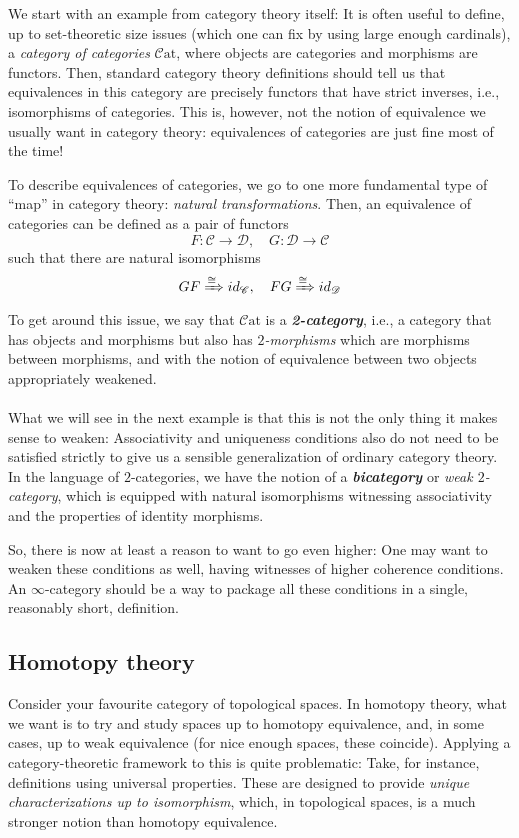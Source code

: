 \documentclass{article}
\newcommand{\textbi}[1]{\textbf{\textit{#1}}}
\newcommand{\C}{\mathscr{C}}
\newcommand{\D}{\mathscr{D}}
\theoremstyle{definition}
\begin{document}
We start with an example from category theory itself: It is often useful to define, up to set-theoretic size issues (which one can fix by using large enough cardinals), a \textit{category of categories} $\mathscr{C}\mathrm{at}$, where objects are categories and morphisms are functors. Then, standard category theory definitions should tell us that equivalences in this category are precisely functors that have strict inverses, i.e., isomorphisms of categories. This is, however, not the notion of equivalence we usually want in category theory: equivalences of categories are just fine most of the time!
\par To describe equivalences of categories, we go to one more fundamental type of ``map'' in category theory: \textit{natural transformations}. Then, an equivalence of categories can be defined as a pair of functors 
$$F:\C\to \D,\quad G:\D\to \C$$
such that there are natural isomorphisms $$GF\xRightarrow{\cong}id_\C, \quad FG\xRightarrow{\cong}id_\D$$
To get around this issue, we say that $\mathscr{C}\mathrm{at}$ is a \textbi{2-category}, i.e., a category that has objects and morphisms but also has \textit{$2$-morphisms} which are morphisms between morphisms, and with the notion of equivalence between two objects appropriately weakened. 
\\ \\
What we will see in the next example is that this is not the only thing it makes sense to weaken: Associativity and uniqueness conditions also do not need to be satisfied strictly to give us a sensible generalization of ordinary category theory. In the language of $2$-categories, we have the notion of a \textbi{bicategory} or \textit{weak $2$-category}, which is equipped with natural isomorphisms witnessing associativity and the properties of identity morphisms. \par
 So, there is now at least a reason to want to go even higher: One may want to weaken these conditions as well, having witnesses of higher coherence conditions. An $\infty$-category should be a way to package all these conditions in a single, reasonably short, definition.

\subsection*{Homotopy theory}

Consider your favourite category of topological spaces. In homotopy theory, what we want is to try and study spaces up to homotopy equivalence, and, in some cases, up to weak equivalence (for nice enough spaces, these coincide). Applying a category-theoretic framework to this is quite problematic: Take, for instance, definitions using universal properties. These are designed to provide \textit{unique characterizations up to isomorphism}, which, in topological spaces, is a much stronger notion than homotopy equivalence. 
\end{document}
